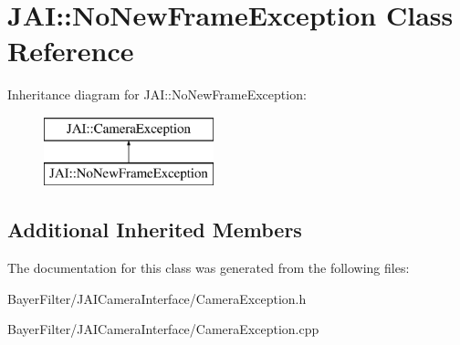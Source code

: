 \hypertarget{class_j_a_i_1_1_no_new_frame_exception}{\section{J\-A\-I\-:\-:No\-New\-Frame\-Exception Class Reference}
\label{class_j_a_i_1_1_no_new_frame_exception}
}
Inheritance diagram for J\-A\-I\-:\-:No\-New\-Frame\-Exception\-:\begin{figure}[H]
\begin{center}
\leavevmode
\includegraphics[height=2.000000cm]{class_j_a_i_1_1_no_new_frame_exception}
\end{center}
\end{figure}
\subsection*{Additional Inherited Members}


The documentation for this class was generated from the following files\-:\begin{DoxyCompactItemize}
\item 
Bayer\-Filter/\-J\-A\-I\-Camera\-Interface/Camera\-Exception.\-h\item 
Bayer\-Filter/\-J\-A\-I\-Camera\-Interface/Camera\-Exception.\-cpp\end{DoxyCompactItemize}
